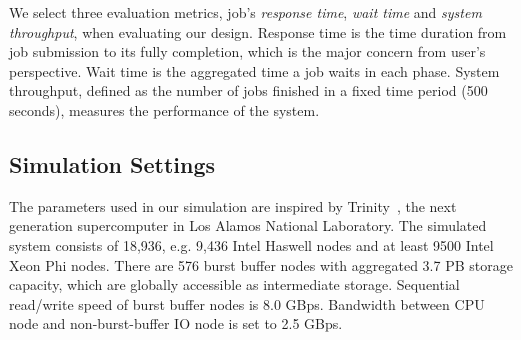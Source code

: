 We select three evaluation metrics, job's \textit{response time}, \textit{wait time} and 
\textit{system throughput}, when evaluating our design.
Response time is the time duration from job submission to its fully completion,
which is the major concern from user's perspective.
Wait time is the aggregated time a job waits in each phase.
System throughput, defined as the number of jobs finished in
a fixed time period (500 seconds), measures the performance of the system.


\subsection{Simulation Settings}

The parameters used in our simulation are inspired by Trinity~\cite{TrinitySystem}, 
the next generation supercomputer in Los Alamos National Laboratory.
The simulated system consists of 18,936,
e.g. 9,436 Intel Haswell nodes
and at least 9500 Intel Xeon Phi nodes.
There are 576 burst buffer nodes with aggregated 3.7 PB storage capacity, 
which are globally accessible as intermediate storage.
Sequential read/write speed of burst buffer nodes is 8.0 GBps.
Bandwidth between CPU node and non-burst-buffer IO node is set to 2.5 GBps.



